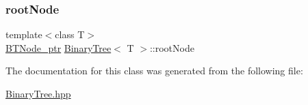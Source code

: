 \mbox{\label{class_binary_tree_a199fe7180a65cb3fd98939bf1389feb8}} 
\subsubsection{\texorpdfstring{root\+Node}{rootNode}}
{\footnotesize\ttfamily template$<$class T$>$ \\
\hyperlink{class_binary_tree_a35ef67d8ee2843144c5c309c5a6ecd5b}{B\+T\+Node\+\_\+ptr} \hyperlink{class_binary_tree}{Binary\+Tree}$<$ T $>$\+::root\+Node\hspace{0.3cm}{\ttfamily [protected]}}



The documentation for this class was generated from the following file\+:\begin{DoxyCompactItemize}
\item 
\hyperlink{_binary_tree_8hpp}{Binary\+Tree.\+hpp}\end{DoxyCompactItemize}
